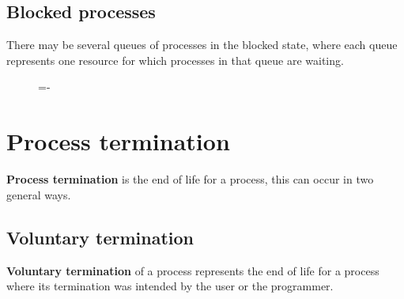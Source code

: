 \documentclass[a4paper]{systems-software}
\begin{document}
\newpage

\subsection*{Blocked processes}

There may be several queues of processes in the blocked state, where each queue represents one resource for which processes in that queue are waiting.

\begin{figure}[H]
  \lineskip=-\fboxrule
\end{figure}


\section*{Process termination}

\textbf{Process termination} is the end of life for a process, this can occur in two general ways.


\subsection*{Voluntary termination}

\textbf{Voluntary termination} of a process represents the end of life for a process where its termination was intended by the user or the programmer.
\end{document}

